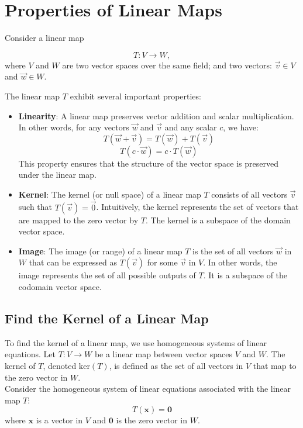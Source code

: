 \section{Properties of Linear Maps}

Consider a linear map 

$$
T : V \rightarrow W,
$$
where $V$ and $W$ are two vector spaces over the same field; and two vectors: $\vec v \in V$ and $\vec w \in W$.

The linear map $T$ exhibit several important properties:

\begin{itemize}
  \item \textbf{Linearity}: A linear map preserves vector addition and scalar multiplication. In other words, for any vectors \( \vec {w} \) and \( \vec {v} \) and any scalar \( c \), we have:
  \[
  T(\vec {w} + \vec {v}) = T(\vec {w}) + T(\vec {v})
  \]
  \[
  T(c \cdot \vec {w}) = c \cdot T(\vec {w})
  \]
  This property ensures that the structure of the vector space is preserved under the linear map.
  
  \item \textbf{Kernel}: The kernel (or null space) of a linear map \( T \) consists of all vectors \( \vec {v} \) such that \( T(\vec {v}) = \vec {0} \). Intuitively, the kernel represents the set of vectors that are mapped to the zero vector by \( T \). The kernel is a subspace of the domain vector space.
  
  \item \textbf{Image}: The image (or range) of a linear map \( T \) is the set of all vectors \( \vec {w} \) in \( W \) that can be expressed as \( T(\vec {v}) \) for some \( \vec {v} \) in \( V \). In other words, the image represents the set of all possible outputs of \( T \). It is a subspace of the codomain vector space.
\end{itemize}

\subsection{Find the Kernel of a Linear Map}

To find the kernel of a linear map, we use homogeneous systems of linear equations. Let $T: V \rightarrow W$ be a linear map between vector spaces $V$ and $W$. The kernel of $T$, denoted $\text{ker}(T)$, is defined as the set of all vectors in $V$ that map to the zero vector in $W$.
\\

Consider the homogeneous system of linear equations associated with the linear map $T$:
\[
T(\mathbf{x}) = \mathbf{0}
\]
where $\mathbf{x}$ is a vector in $V$ and $\mathbf{0}$ is the zero vector in $W$.

